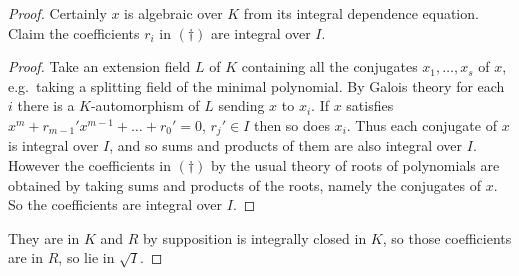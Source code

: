 \documentclass[a4paper]{article}
\begin{document}
\begin{proof}
  Certainly \(x\) is algebraic over \(K\) from its integral dependence equation. Claim the coefficients \(r_i\) in \((\dagger)\) are integral over \(I\).
  \begin{proof}
    Take an extension field \(L\) of \(K\) containing all the conjugates \(x_1, \dots, x_s\) of \(x\), e.g.\ taking a splitting field of the minimal polynomial. By Galois theory for each \(i\) there is a \(K\)-automorphism of \(L\) sending \(x\) to \(x_i\). If \(x\) satisfies \(x^m + r_{m - 1}' x^{m - 1} + \dots + r_0' = 0\), \(r_j' \in I\) then so does \(x_i\). Thus each conjugate of \(x\) is integral over \(I\), and so sums and products of them are also integral over \(I\). However the coefficients in \((\dagger)\) by the usual theory of roots of polynomials are obtained by taking sums and products of the roots, namely the conjugates of \(x\). So the coefficients are integral over \(I\).
  \end{proof}
  They are in \(K\) and \(R\) by supposition is integrally closed in \(K\), so those coefficients are in \(R\), so lie in \(\sqrt I\).
\end{proof}
\end{document}
